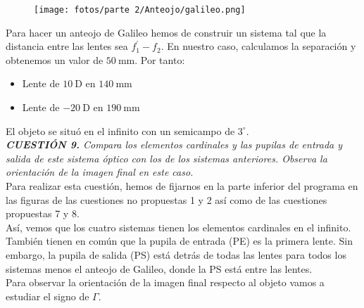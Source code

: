 \documentclass[11pt]{article}
\begin{document}
        \begin{figure}
                \vspace{-1cm}
                \centering
                \texttt{[image: fotos/parte 2/Anteojo/galileo.png]}
        \end{figure}

        Para hacer un anteojo de Galileo hemos de construir un sistema tal que la distancia entre las lentes sea $f^\prime_1 - f_2$. En nuestro caso, calculamos la separación y obtenemos un valor de $50\ $mm. Por tanto:
        \begin{itemize}
            \item Lente de $10\ $D en $140\ $mm
            \item Lente de $-20\ $D en $190\ $mm
        \end{itemize}
        El objeto se situó en el infinito con un semicampo de $3^\circ$.\\

        \vspace{0.4cm}
        \textit{\textbf{CUESTIÓN 9.} Compara los elementos cardinales y las pupilas de entrada y salida de este sistema óptico con los de los sistemas anteriores. Observa la orientación de la imagen final en este caso.}\\

        Para realizar esta cuestión, hemos de fijarnos en la parte inferior del programa en las figuras de las cuestiones no propuestas 1 y 2 así como de las cuestiones propuestas 7 y 8.\\
        
        Así, vemos que los cuatro sistemas tienen los elementos cardinales en el infinito. También tienen en común que la pupila de entrada (PE) es la primera lente. Sin embargo, la pupila de salida (PS) está detrás de todas las lentes para todos los sistemas menos el anteojo de Galileo, donde la PS está entre las lentes.\\
        
        \clearpage
        Para observar la orientación de la imagen final respecto al objeto vamos a estudiar el signo de $\Gamma$. 
\end{document}
